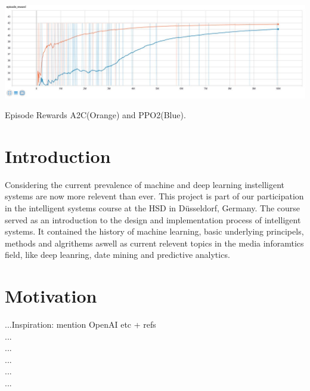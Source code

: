 \documentclass[sigconf]{acmart}
\begin{document}
\begin{teaserfigure}
 \includegraphics[width=\textwidth]{episode_reward_big} %
  \caption{Episode Rewards A2C(Orange) and PPO2(Blue).}
  \label{fig:teaser}
\end{teaserfigure}

\maketitle 

\section{Introduction}
Considering the current prevalence of machine and deep learning instelligent systems are now more relevent than ever.
This project is part of our participation in the intelligent systems course at the HSD in Düsseldorf, Germany. The course served as an introduction to the design and implementation process of intelligent systems. It contained the history of machine learning, basic underlying principels, methods and algrithems aswell as current relevent topics in the media inforamtics field, like deep leanring, date mining and predictive analytics. 
  
\section{Motivation}
 ...Inspiration: mention OpenAI etc + refs \\
 ...\\
 ...\\
 ...\\
 ...\\
 ...\\
\end{document}
